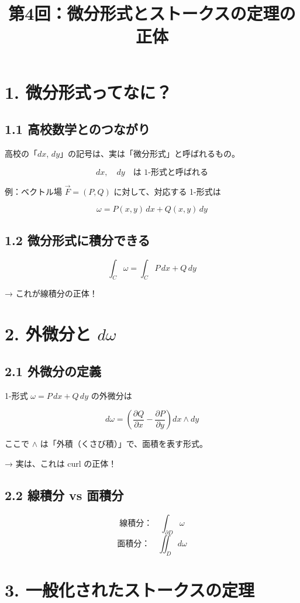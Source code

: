 \documentclass[a4j,11pt]{jsarticle}
\title{第4回：微分形式とストークスの定理の正体}
\author{}
\date{}
\begin{document}
\maketitle

\section*{1. 微分形式ってなに？}

\subsection*{1.1 高校数学とのつながり}
高校の「$dx$, $dy$」の記号は、実は「微分形式」と呼ばれるもの。

\[
dx, \quad dy \quad \text{は 1-形式と呼ばれる}
\]

例：ベクトル場 $\vec{F} = (P, Q)$ に対して、対応する 1-形式は

\[
\omega = P(x, y) \, dx + Q(x, y) \, dy
\]

\subsection*{1.2 微分形式に積分できる}
\[
\int_C \omega = \int_C P \, dx + Q \, dy
\]

→ これが線積分の正体！

\section*{2. 外微分と $d\omega$}

\subsection*{2.1 外微分の定義}
1-形式 $\omega = P \, dx + Q \, dy$ の外微分は

\[
d\omega = \left( \frac{\partial Q}{\partial x} - \frac{\partial P}{\partial y} \right) dx \wedge dy
\]

ここで $\wedge$ は「外積（くさび積）」で、面積を表す形式。

→ 実は、これは curl の正体！

\subsection*{2.2 線積分 vs 面積分}
\[
\text{線積分：} \quad \int_{\partial D} \omega
\]
\[
\text{面積分：} \quad \iint_D d\omega
\]

\section*{3. 一般化されたストークスの定理}
\end{document}
